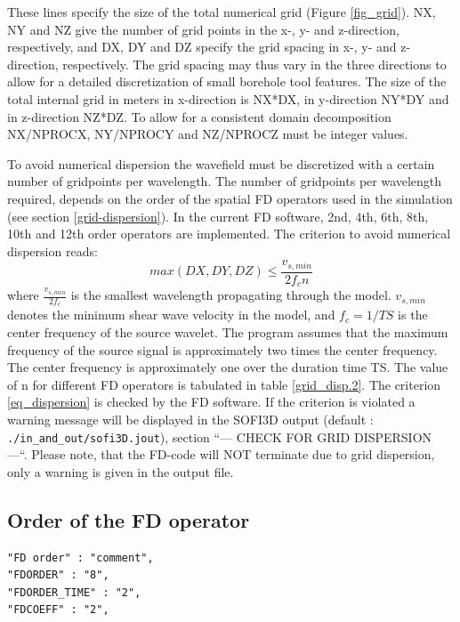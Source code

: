 \documentclass{hitec}
\begin{document}
These lines specify the size of the total numerical grid (Figure  \ref{fig_grid}). NX, NY and NZ give the number of grid points in the x-, y- and z-direction, respectively, and DX, DY and DZ
specify the grid spacing in x-, y- and z-direction, respectively. The grid spacing may thus vary in the three directions to allow for a detailed discretization of small borehole tool features.
The size of the total internal grid in meters in x-direction is NX*DX, in y-direction NY*DY  and in z-direction NZ*DZ. To allow for a consistent domain decomposition NX/NPROCX, NY/NPROCY and NZ/NPROCZ must be integer values.

To avoid numerical dispersion the wavefield must be discretized with a certain number of gridpoints per wavelength. The number of gridpoints per wavelength required, depends on the order of the spatial
FD operators used in the simulation (see section \ref{grid-dispersion}). In the current FD software, 2nd, 4th, 6th, 8th, 10th and 12th order operators are implemented. The criterion to avoid numerical dispersion reads:
\begin{equation}
max(DX,DY,DZ)\le\frac{v_{s,min}}{2 f_c n} \label{eq_dispersion}
\end{equation}
where $\frac{v_{s,min}}{2 f_c}$ is the smallest wavelength propagating through the model. $v_{s,min}$ denotes the minimum shear wave velocity in the model, and $f_c=1/TS$ is the center frequency of the source wavelet. The program assumes that the maximum frequency of the source signal is approximately two times the center frequency. The center frequency is approximately one over the duration time TS. The value of n for different FD operators is tabulated in table \ref{grid_disp.2}. The criterion \ref{eq_dispersion} is checked by the FD software. If the criterion is violated a warning message will be displayed in the SOFI3D output (default :  \lstinline{./in_and_out/sofi3D.jout}), section ``--- CHECK FOR GRID DISPERSION ---``. Please note, that the FD-code will NOT terminate due to grid dispersion, only a warning is given in the output file.

\subsection{Order of the FD operator}

\begin{verbatim}
"FD order" : "comment",
"FDORDER" : "8",
"FDORDER_TIME" : "2",
"FDCOEFF" : "2",
\end{verbatim}
\end{document}
